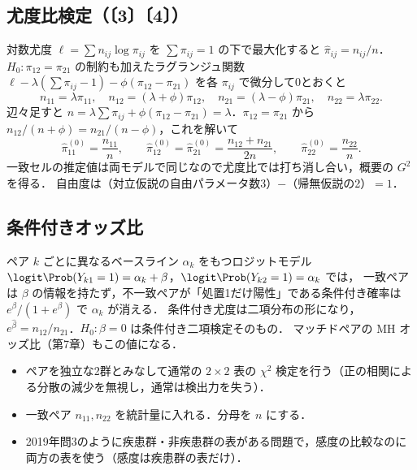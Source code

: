 \subsection{尤度比検定（〔3〕〔4〕）}
対数尤度 $\ell=\sum n_{ij}\log\pi_{ij}$ を $\sum\pi_{ij}=1$ の下で最大化すると $\hat\pi_{ij}=n_{ij}/n$．
$H_0:\pi_{12}=\pi_{21}$ の制約も加えたラグランジュ関数 $\ell-\lambda(\sum\pi_{ij}-1)-\phi(\pi_{12}-\pi_{21})$ を各 $\pi_{ij}$ で微分して0とおくと
\[
n_{11}=\lambda\pi_{11},\quad n_{12}=(\lambda+\phi)\pi_{12},\quad n_{21}=(\lambda-\phi)\pi_{21},\quad n_{22}=\lambda\pi_{22}.
\]
辺々足すと $n=\lambda\sum\pi_{ij}+\phi(\pi_{12}-\pi_{21})=\lambda$．$\pi_{12}=\pi_{21}$ から $n_{12}/(n+\phi)=n_{21}/(n-\phi)$，これを解いて
\[
\hat\pi^{(0)}_{11}=\frac{n_{11}}n,\qquad \hat\pi^{(0)}_{12}=\hat\pi^{(0)}_{21}=\frac{n_{12}+n_{21}}{2n},\qquad \hat\pi^{(0)}_{22}=\frac{n_{22}}n .
\]
一致セルの推定値は両モデルで同じなので尤度比では打ち消し合い，概要の $G^2$ を得る．
自由度は（対立仮説の自由パラメータ数3）$-$（帰無仮説の2）$=1$．

\subsection{条件付きオッズ比}
ペア $k$ ごとに異なるベースライン $\alpha_k$ をもつロジットモデル $\logit\Prob(Y_{k1}=1)=\alpha_k+\beta$，$\logit\Prob(Y_{k2}=1)=\alpha_k$ では，
一致ペアは $\beta$ の情報を持たず，不一致ペアが「処置1だけ陽性」である条件付き確率は $e^\beta/(1+e^\beta)$ で $\alpha_k$ が消える．
条件付き尤度は二項分布の形になり，$e^{\hat\beta}=n_{12}/n_{21}$．$H_0:\beta=0$ は条件付き二項検定そのもの．
マッチドペアの MH オッズ比（第7章）もこの値になる．

\begin{warnbox}
\begin{itemize}
\item ペアを独立な2群とみなして通常の $2\times2$ 表の $\chi^2$ 検定を行う（正の相関による分散の減少を無視し，通常は検出力を失う）．
\item 一致ペア $n_{11},n_{22}$ を統計量に入れる．分母を $n$ にする．
\item 2019年問3のように疾患群・非疾患群の表がある問題で，感度の比較なのに両方の表を使う（感度は疾患群の表だけ）．
\end{itemize}
\end{warnbox}

